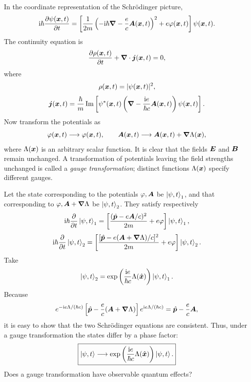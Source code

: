 In the coordinate representation of the Schr\"odinger picture,
\begin{equation}
\mathrm{i}\hbar\frac{\partial\psi(\bm{x},t)}{\partial t}
=\left[\frac1{2m}\left(-\mathrm{i}\hbar\bm{\nabla}-\frac ec\bm{A}(\bm{x},t)\right)^2
+e\varphi(\bm{x},t)\right]\psi(\bm{x},t).
\end{equation}
The continuity equation is
\begin{equation}
\frac{\partial\rho(\bm{x},t)}{\partial t}
+\bm{\nabla}\cdot\bm{j}(\bm{x},t)=0,
\end{equation}
where
\begin{equation}
\rho(\bm{x},t)=|\psi(\bm{x},t)|^2,
\end{equation}
\begin{equation}
\bm{j}(\bm{x},t)=\frac\hbar m\operatorname{Im}
\left[\psi^*(\bm{x},t)
\left(\bm{\nabla}-\frac{\mathrm{i} e}{\hbar c}\bm{A}(\bm{x},t)\right)
\psi(\bm{x},t)\right].
\end{equation}
Now transform the potentials as
\begin{equation}
\varphi(\bm{x},t)\longrightarrow\varphi(\bm{x},t),\qquad
\bm{A}(\bm{x},t)\longrightarrow\bm{A}(\bm{x},t)+\bm{\nabla}\Lambda(\bm{x}),
\end{equation}
where $\Lambda(\bm{x})$ is an arbitrary scalar function. It is clear that the fields $\bm{E}$ and $\bm{B}$ remain unchanged. A transformation of potentials leaving the field strengths unchanged is called a \emph{gauge transformation}; distinct functions $\Lambda(\bm{x})$ specify different gauges.

Let the state corresponding to the potentials $\varphi,\bm{A}$ be $\left|\psi,t\right\rangle_1$, and that corresponding to $\varphi,\bm{A}+\bm{\nabla}\Lambda$ be $\left|\psi,t\right\rangle_2$. They satisfy respectively
\begin{equation}
\mathrm{i}\hbar\frac{\partial}{\partial t}\left|\psi,t\right\rangle_1
=\left[\frac{(\hat{\bm{p}}-e\bm{A}/c)^2}{2m}+e\varphi\right]\left|\psi,t\right\rangle_1,
\end{equation}
\begin{equation}
\mathrm{i}\hbar\frac{\partial}{\partial t}\left|\psi,t\right\rangle_2
=\left[\frac{[\hat{\bm{p}}-e(\bm{A}+\bm{\nabla}\Lambda)/c]^2}{2m}
+e\varphi\right]\left|\psi,t\right\rangle_2.
\end{equation}
Take
\begin{equation}
\left|\psi,t\right\rangle_2=\exp\left(\frac{\mathrm{i} e}{\hbar c}\Lambda(\hat{\bm{x}})\right)\left|\psi,t\right\rangle_1.
\end{equation}
Because
\begin{equation}
e^{-\mathrm{i} e\Lambda/(\hbar c)}
\left[\hat{\bm{p}}-\frac ec(\bm{A}+\bm{\nabla}\Lambda)\right]
e^{\mathrm{i} e\Lambda/(\hbar c)}
=\hat{\bm{p}}-\frac ec\bm{A},
\end{equation}
it is easy to show that the two Schr\"odinger equations are consistent. Thus, under a gauge transformation the states differ by a phase factor:
\begin{equation}
\boxed{\left|\psi,t\right\rangle\longrightarrow
\exp\left(\frac{\mathrm{i} e}{\hbar c}\Lambda(\hat{\bm{x}})\right)\left|\psi,t\right\rangle.}
\end{equation}
Does a gauge transformation have observable quantum effects?

